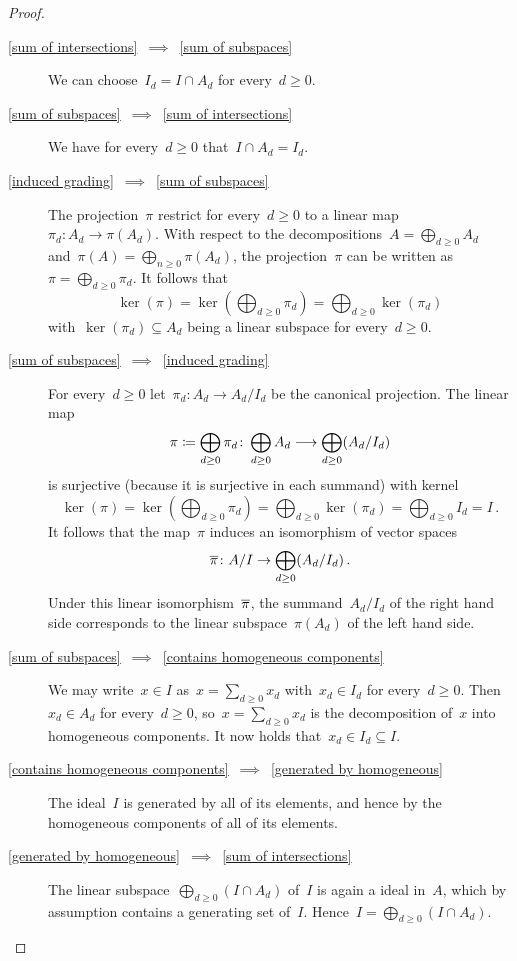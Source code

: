 \documentclass[a4paper,10pt,numbers = noenddot]{scrartcl}
\begin{document}
\begin{proof}
  \leavevmode
  \begin{description}
    \item[\ref*{sum of intersections}~$\implies$~\ref*{sum of subspaces}]
      We can choose~$I_d = I \cap A_d$ for every~$d \geq 0$.
    \item[\ref*{sum of subspaces}~$\implies$~\ref*{sum of intersections}]
      We have for every~$d \geq 0$ that~$I \cap A_d = I_d$.
    \item[\ref*{induced grading}~$\implies$~\ref*{sum of subspaces}]
      The projection~$\pi$ restrict for every~$d \geq 0$ to a linear map~$\pi_d \colon A_d \to \pi(A_d)$.
      With respect to the decompositions~$A = \bigoplus_{d \geq 0} A_d$ and~$\pi(A) = \bigoplus_{n \geq 0} \pi(A_d)$, the projection~$\pi$ can be written as~$\pi = \bigoplus_{d \geq 0} \pi_d$.
      It follows that
      \[
          \ker(\pi)
        = \ker\left( \bigoplus_{d \geq 0} \pi_d \right)
        = \bigoplus_{d \geq 0} \ker(\pi_d)
      \]
      with~$\ker(\pi_d) \subseteq A_d$ being a linear subspace for every~$d \geq 0$.
    \item[\ref*{sum of subspaces}~$\implies$~\ref*{induced grading}]
      For every~$d \geq 0$ let~$\pi_d \colon A_d \to A_d/I_d$ be the canonical projection.
      The linear map
      \[
                  \pi
        \coloneqq  \bigoplus_{d \geq 0} \pi_d
        \colon    \bigoplus_{d \geq 0} A_d
        \longrightarrow   \bigoplus_{d \geq 0} (A_d / I_d)
      \]
      is surjective (because it is surjective in each summand) with kernel
      \[
          \ker(\pi)
        = \ker\left( \bigoplus_{d \geq 0} \pi_d \right)
        = \bigoplus_{d \geq 0} \ker(\pi_d)
        = \bigoplus_{d \geq 0} I_d
        = I \,.
      \]
      It follows that the map~$\pi$ induces an isomorphism of vector spaces
      \[
                \overline{\pi}
        \colon  A/I
        \to     \bigoplus_{d \geq 0} (A_d/I_d) \,.
      \]
      Under this linear isomorphism~$\overline{\pi}$, the summand~$A_d/I_d$ of the right hand side corresponds to the linear subspace~$\pi(A_d)$ of the left hand side.
    \item[\ref*{sum of subspaces}~$\implies$~\ref*{contains homogeneous components}]
      We may write~$x \in I$ as~$x = \sum_{d \geq 0} x_d$ with~$x_d \in I_d$ for every~$d \geq 0$.
      Then~$x_d \in A_d$ for every~$d \geq 0$, so~$x = \sum_{d \geq 0} x_d$ is the decomposition of~$x$ into homogeneous components.
      It now holds that~$x_d \in I_d \subseteq I$.
    \item[\ref*{contains homogeneous components}~$\implies$~\ref*{generated by homogeneous}]
      The ideal~$I$ is generated by all of its elements, and hence by the homogeneous components of all of its elements.
    \item[\ref*{generated by homogeneous}~$\implies$~\ref*{sum of intersections}]
      The linear subspace~$\bigoplus_{d \geq 0} (I \cap A_d)$ of~$I$ is again a {\twosided} ideal in~$A$, which by assumption contains a generating set of~$I$.
      Hence~$I = \bigoplus_{d \geq 0} (I \cap A_d)$.
    \qedhere
  \end{description}
\end{proof}
\end{document}
